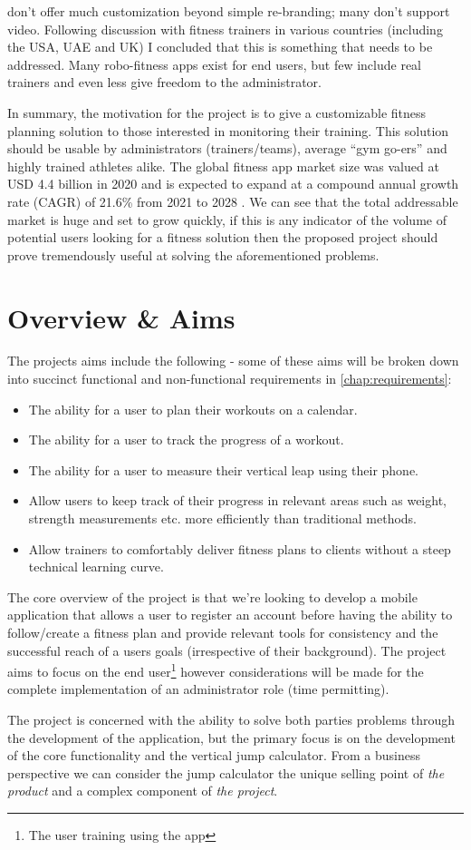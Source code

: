 don't offer much customization beyond simple re-branding; many don't support video.
Following discussion with fitness trainers in various countries (including the USA, UAE and UK)
I concluded that this is something that needs to be addressed. Many robo-fitness apps
exist for end users, but few include real trainers and even less give
freedom to the administrator.
\par
In summary, the motivation for the project is to give a customizable fitness planning
solution to those interested in monitoring their training. This solution should be
usable by administrators (trainers/teams), average ``gym go-ers'' and
highly trained athletes alike. The global fitness app market size
was valued at USD 4.4 billion in 2020 and is expected to expand at a
compound annual growth rate (CAGR) of 21.6\% from 2021 to 2028 \cite{fitness-app-market-size}.
We can see that the total addressable market is huge and set to grow quickly,
if this is any indicator of the volume of potential users looking for a fitness solution then the proposed
project should prove tremendously useful at solving the aforementioned problems.
\pagebreak

\section{Overview \& Aims}
\label{sec:intro_overview}
The projects aims include the following - some of these aims will be broken down into
succinct functional and non-functional requirements in \cref{chap:requirements}:
\begin{itemize}
	\item The ability for a user to plan their workouts on a calendar.
	\item The ability for a user to track the progress of a workout.
	\item The ability for a user to measure their vertical leap using their phone.
	\item Allow users to keep track of their progress in relevant areas
	      such as weight, strength measurements etc. more efficiently than traditional methods.
	\item Allow trainers to comfortably deliver fitness plans to
	      clients without a steep technical learning curve.
\end{itemize}
The core overview of the project is that we're looking to develop a mobile application that
allows a user to register an account before having the ability to follow/create a fitness plan
and provide relevant tools for consistency and the successful reach of a users goals
(irrespective of their background). The project aims to focus on the 
end user\footnote{The user training using the app} however considerations will be made for 
the complete implementation of an administrator role (time permitting).
\par
The project is concerned with the ability to solve both parties problems through the development
of the application, but the primary focus is on the development of the core functionality
and the vertical jump calculator. From a business perspective we can consider the jump calculator
the unique selling point of \textit{the product} and
a complex component of \textit{the project}.
